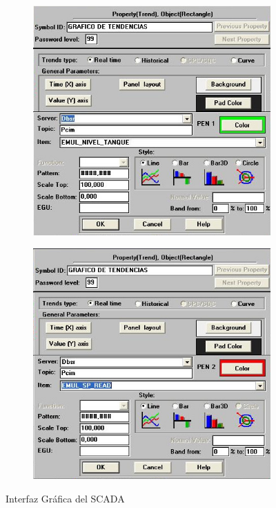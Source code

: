 \begin{figure}[!ht]
\begin{subfigure}[b]{0.2\textwidth}
	    \caption{}
	    \label{}
  	\end{subfigure}
	\begin{subfigure}[b]{0.2\textwidth}
	   \includegraphics[width=\textwidth]{Cap5-SCADA/images/tendencia2.jpeg}
	    \caption{}
	    \label{}
  	\end{subfigure}
	\begin{subfigure}[b]{0.2\textwidth}
	   \includegraphics[width=\textwidth]{Cap5-SCADA/images/tendencia3.jpeg}
	    \caption{}
	    \label{}
  	\end{subfigure}
	\caption{Interfaz Gráfica del SCADA}
	\label{fig:tendhmi}
  \end{figure}


